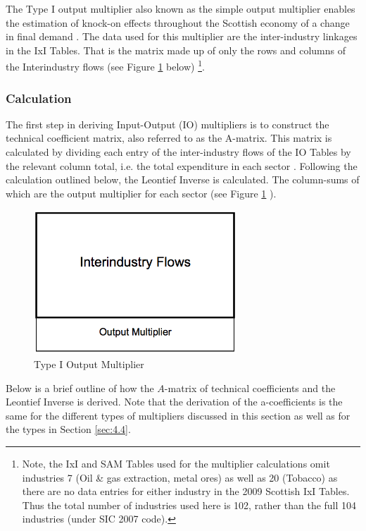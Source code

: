 \begin{doublespacing}
The Type I output multiplier also known as the simple output multiplier enables the estimation of knock-on effects throughout the Scottish economy of a change in final demand \cite{Miller2009}. The data used for this multiplier are the inter-industry linkages in the IxI Tables. That is the matrix made up of only the rows and columns of the Interindustry flows (see Figure \ref{fig:4.3.1} below) \footnote{ Note, the IxI and SAM Tables used for the multiplier calculations omit industries 7 (Oil \& gas extraction, metal ores) as well as 20 (Tobacco) as there are no data entries for either industry in the 2009 Scottish IxI Tables. Thus the total number of industries used here is 102, rather than the full 104 industries (under SIC 2007 code).}.

\subsubsection{Calculation}

The first step in deriving Input-Output (IO) multipliers is to construct the technical coefficient matrix, also referred to as the A-matrix. This matrix is calculated by dividing each entry of the inter-industry flows of the IO Tables by the relevant column total, i.e. the total expenditure in each sector \cite{Miller2009}. Following the calculation outlined below, the Leontief Inverse is calculated. The column-sums of which are the output multiplier for each sector (see Figure \ref{fig:4.3.1} ).

\bigskip

\begin{figure}[hb]
\label{fig:4.3.1}
  \centering
  \includegraphics[width=3in]{T1OutputMultiplier}
  \caption{Type I Output Multiplier}
\end{figure}

\bigskip

Below is a brief outline of how the $\textit{A}$-matrix of technical coefficients and the Leontief Inverse is derived. Note that the derivation of the a-coefficients is the same for the different types of multipliers discussed in this section as well as for the types in Section \ref{sec:4.4}.


\end{doublespacing}
